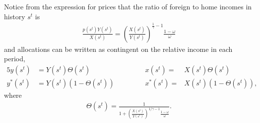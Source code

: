\documentclass[11pt,pdftex,twoside,letterpaper]{exam}
\begin{document}
Notice from the expression for prices that the ratio of foreign to home incomes in history $s^t$ is
\begin{eqnarray}
  \frac{p(s^t)Y(s^t)}{X(s^t)}= \left(\frac{X(s^t)}{Y(s^t)}\right)^{\frac{1}{\gamma}-1}\frac{1-\omega}{\omega}
\end{eqnarray}
and allocations can be written as contingent on the relative income in each period,
\begin{alignat}{5}
  y(s^t) &= Y(s^t)\Theta(s^t) &\qquad&&x(s^t) =& X(s^t)\Theta(s^t)\\
   y^*(s^t) &= Y(s^t)\left(1-\Theta(s^t)\right)  &\qquad&&x^*(s^t) =& X(s^t)\left(1-\Theta(s^t)\right),
\end{alignat}
where
\begin{align}
\Theta(s^t) = \frac{1}{1+\left(\frac{X(s^t)}{Y(s^t)}\right)^{1/\gamma-1}\frac{1-\omega}{\omega}}.
\end{align}
\end{document}
